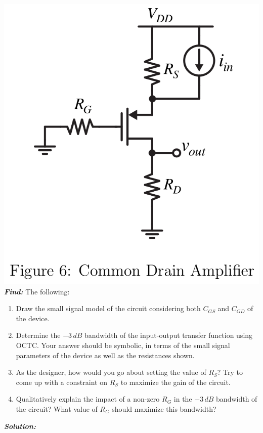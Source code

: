 \documentclass[12pt, fleqn]{article}
\begin{document}
\includegraphics[scale=0.35, center]{p2f6.PNG}\\

\vspace{0.5cm}
\noindent
\textbf{\emph{Find: }} The following:

\begin{enumerate}[label=(\alph*)]
    \item
    {
    Draw the small signal model of the circuit considering both $C_{GS}$ and $C_{GD}$ of the device.
    }
    \item
    {
    Determine the $-3\,dB$ bandwidth of the input-output transfer function using OCTC. Your answer should be symbolic, in terms of the small signal parameters of the device as well as the resistances shown.
    }
    \item
    {
    As the designer, how would you go about setting the value of $R_S$? Try to come up with a constraint on $R_S$ to maximize the gain of the circuit.
    }
    \item
    {
    Qualitatively explain the impact of a non-zero $R_G$ in the $-3\,dB$ bandwidth of the circuit? What value of $R_G$ should maximize this bandwidth?
    }
\end{enumerate}
\newpage
\noindent
\textbf{\emph{Solution: }}
\end{document}
